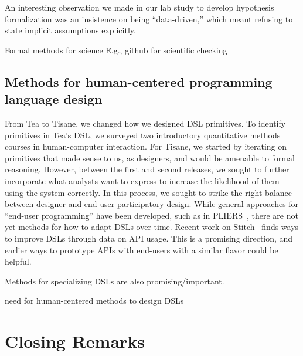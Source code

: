 An interesting observation we made in our lab study to develop hypothesis
formalization was an insistence on being ``data-driven,'' which meant refusing
to state implicit assumptions explicitly.


Formal methods for science
E.g., github for scientific checking 






\subsection{Methods for human-centered programming language design}
From Tea to Tisane, we changed how we designed DSL primitives. To identify
primitives in Tea's DSL, we surveyed two introductory quantitative methods
courses in human-computer interaction. For Tisane, we started by iterating on
primitives that made sense to us, as designers, and would be amenable to formal
reasoning. However, between the first and second releases, we sought to further
incorporate what analysts want to express to increase the likelihood of them
using the system correctly. In this process, we sought to strike the right
balance between designer and end-user participatory design. While general
approaches for ``end-user programming'' have been developed, such as in
PLIERS~\cite{}, there are not yet methods for how to adapt DSLs over time.
Recent work on Stitch~\cite{} finds ways to improve DSLs through data on API
usage. This is a promising direction, and earlier ways to prototype APIs with
end-users with a similar flavor could be helpful. 

Methods for specializing DSLs are also promising/important.

need for human-centered methods to design DSLs

\section{Closing Remarks}
